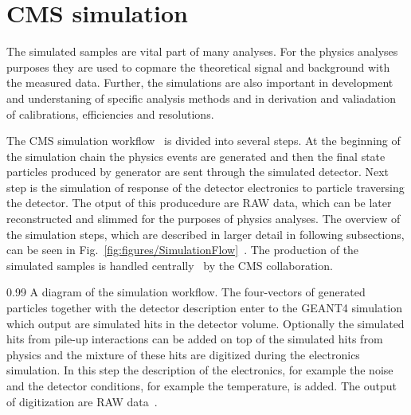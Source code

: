 
\clearpage

\setcounter{secnumdepth}{4}
\setcounter{secnumdepth}{5}


\section{CMS simulation}

The simulated samples are vital part of many analyses. For the physics analyses purposes they are used to copmare the theoretical signal and background with the measured data. Further, the simulations are also important in development and understaning of specific analysis methods and in derivation and valiadation of calibrations, efficiencies and resolutions.

The CMS simulation workflow~\cite{Banerjee:2007zz, Hildreth:2017vpw, Hildreth:2015kps, website:simuBasics } is divided into several steps. At the beginning of the simulation chain the physics events are generated and then the final state particles produced by generator are sent through the simulated detector. Next step is the simulation of response of the detector electronics to particle traversing the detector. The otput of this producedure are RAW data, which can be later reconstructed and slimmed for the purposes of physics analyses. The overview of the simulation steps, which are described in larger detail in following subsections, can be seen in Fig.~\ref{fig:figures/SimulationFlow}~\cite{website:simuBasics}. The production of the simulated samples is handled centrally~\cite{Boudoul:2015bkp} by the CMS collaboration.

                 {0.99}       %
                 { A diagram of the simulation workflow. The four-vectors of generated particles together with the detector description enter to the GEANT4 simulation which output are simulated hits in the detector volume. Optionally the simulated hits from pile-up interactions can be added on top of the simulated hits from physics and the mixture of these hits are digitized during the electronics simulation. In this step the description of the electronics, for example the noise and the detector conditions, for example the temperature, is added. The output of digitization are RAW data~\cite{website:simuBasics}. }


